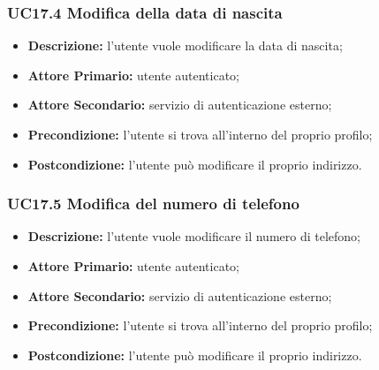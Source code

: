 \subsubsection{UC17.4 Modifica della data di nascita}
\label{sec:UC17.4}
\begin{itemize}
    \item \textbf{Descrizione:} l'utente vuole modificare la data di nascita;
    \item \textbf{Attore Primario:} utente autenticato;
    \item \textbf{Attore Secondario:} servizio di autenticazione esterno;
    \item \textbf{Precondizione:} l'utente si trova all'interno del proprio profilo;
    \item \textbf{Postcondizione:} l'utente può modificare il proprio indirizzo.
\end{itemize}

\subsubsection{UC17.5 Modifica del numero di telefono}
\label{sec:UC17.5}
\begin{itemize}
    \item \textbf{Descrizione:} l'utente vuole modificare il numero di telefono;
    \item \textbf{Attore Primario:} utente autenticato;
    \item \textbf{Attore Secondario:} servizio di autenticazione esterno;
    \item \textbf{Precondizione:} l'utente si trova all'interno del proprio profilo;
    \item \textbf{Postcondizione:} l'utente può modificare il proprio indirizzo.
\end{itemize}